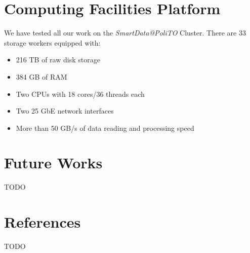 \documentclass[12pt]{beamer}
\begin{document}
	\section{Computing Facilities Platform}
	\begin{frame}{\secname}
		We have tested all our work on the \textit{SmartData@PoliTO} Cluster.
		There are $33$ storage workers equipped with:
		\begin{itemize}
			\item 216 TB of raw disk storage
			\item 384 GB of RAM
			\item Two CPUs with 18 cores/36 threads each
			\item Two 25 GbE network interfaces
			\item More than 50 GB/s of data reading and processing speed
		\end{itemize}
	\end{frame}
	\section{Future Works}
	\begin{frame}{\secname}
		TODO
	\end{frame}
	\section{References}
	\begin{frame}{\secname}
		TODO
	\end{frame}
\end{document}
